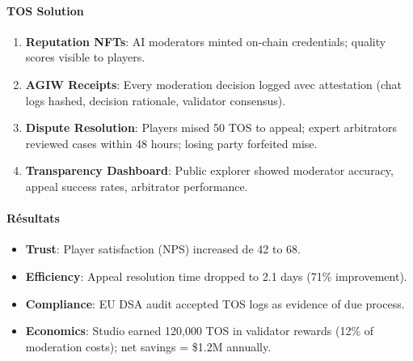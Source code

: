 \documentclass[11pt]{article}
\begin{document}
\paragraph{TOS Solution}
\begin{enumerate}[noitemsep]
  \item \textbf{Reputation NFTs}: AI moderators minted on-chain credentials; quality scores visible to players.
  \item \textbf{AGIW Receipts}: Every moderation decision logged avec attestation (chat logs hashed, decision rationale, validator consensus).
  \item \textbf{Dispute Resolution}: Players mised 50 TOS to appeal; expert arbitrators reviewed cases within 48 hours; losing party forfeited mise.
  \item \textbf{Transparency Dashboard}: Public explorer showed moderator accuracy, appeal success rates, arbitrator performance.
\end{enumerate}

\paragraph{Résultats}
\begin{itemize}[noitemsep]
  \item \textbf{Trust}: Player satisfaction (NPS) increased de 42 to 68.
  \item \textbf{Efficiency}: Appeal resolution time dropped to 2.1 days (71\% improvement).
  \item \textbf{Compliance}: EU DSA audit accepted TOS logs as evidence of due process.
  \item \textbf{Economics}: Studio earned 120,000 TOS in validator rewards (12\% of moderation costs); net savings = \$1.2M annually.
\end{itemize}
\end{document}
